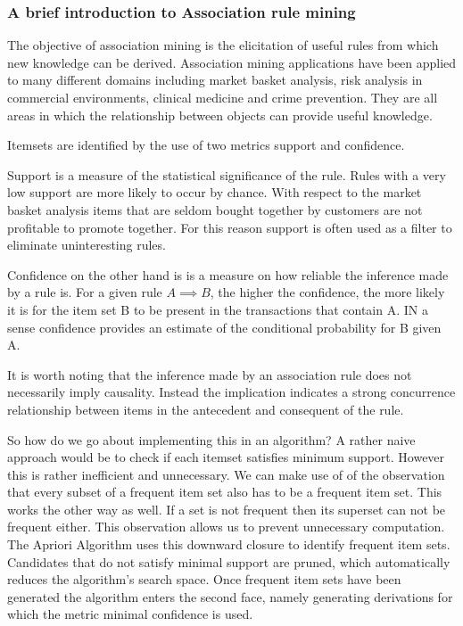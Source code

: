 \subsubsection{A brief introduction to Association rule mining}

The objective of association  mining is the elicitation of useful rules from which new knowledge can be derived. Association mining applications have been applied to many different domains including market basket analysis, risk analysis in commercial environments, clinical medicine and crime prevention. They are all areas in which the relationship between objects can provide useful knowledge. 

Itemsets are identified by the use of two metrics support and confidence. 

Support is a measure of the statistical significance of the rule. Rules with a very low support are more likely to occur by chance. With respect to the market basket analysis items that are seldom bought together by customers are not profitable to promote together. For this reason support is often used as a filter to eliminate uninteresting rules. 

Confidence on the other hand is is a measure on how reliable the inference made by a rule is. For a given rule $A \implies B$, the higher the confidence, the more likely it is for the item set B to be present in the transactions that contain A. IN a sense confidence provides an estimate of the conditional probability for B given A. 

It is worth noting that the inference made by an association rule does not necessarily imply causality. Instead the implication indicates a strong concurrence relationship between items in the antecedent and consequent of the rule. 

So how do we go about implementing this in an algorithm? A rather naive approach would be to check if each itemset satisfies minimum support. However this is rather inefficient and unnecessary. We can make use of of the observation that every subset of a frequent item set also has to be a frequent item set. This works the other way as well. If a set is not frequent then its superset can not be frequent either. This observation allows us to prevent unnecessary computation. The Apriori Algorithm uses this downward closure to identify frequent item sets. Candidates that do not satisfy minimal support are pruned, which automatically reduces the algorithm's search space. Once frequent item sets have been generated the algorithm enters the second face, namely generating derivations for which the metric minimal confidence is used. 

